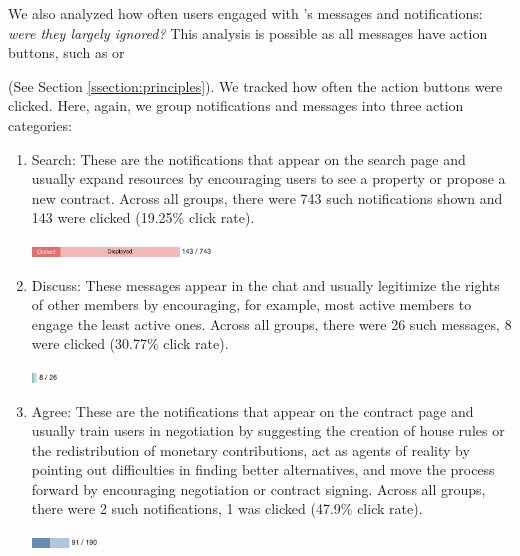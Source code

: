 We also analyzed how often users engaged with \cbot's messages and notifications: \textit{were they largely ignored?} This analysis is possible as all messages have action buttons, such as  or 

(See Section \ref{ssection:principles}). We tracked how often the action buttons were clicked. Here, again, we group notifications and messages into three action categories: 

\begin{enumerate}
    \item Search: These are the notifications that appear on the search page and usually expand resources by encouraging users to see a property or propose a new contract.
    Across all groups, there were 743 such notifications shown and 143 were clicked (19.25\% click rate).
    
    \vspace{0.1cm}\includegraphics[height=10px]{images/clicks/search-with-label.pdf}
    
    \item Discuss: These messages appear in the chat and usually legitimize the rights of other members by encouraging, for example, most active members to engage the least active ones. Across all groups, there were 26 such messages, 8 were clicked (30.77\% click rate).

    \vspace{0.1cm}\includegraphics[height=10px]{images/clicks/discuss-with-label.pdf}
    
    \item Agree: These are the notifications that appear on the contract page and usually train users in negotiation by suggesting the creation of house rules or the redistribution of monetary contributions, act as agents of reality by pointing out difficulties in finding better alternatives, and move the process forward by encouraging negotiation or contract signing. Across all groups, there were 2 such notifications, 1 was clicked (47.9\% click rate).

    \vspace{0.1cm}\includegraphics[height=10px]{images/clicks/agree-with-label.pdf}
\end{enumerate}

